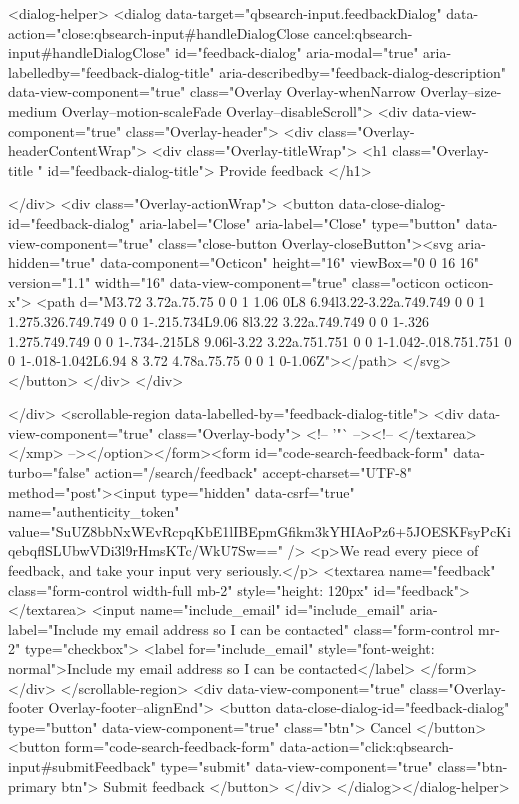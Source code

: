 <dialog-helper>
  <dialog data-target="qbsearch-input.feedbackDialog" data-action="close:qbsearch-input#handleDialogClose cancel:qbsearch-input#handleDialogClose" id="feedback-dialog" aria-modal="true" aria-labelledby="feedback-dialog-title" aria-describedby="feedback-dialog-description" data-view-component="true" class="Overlay Overlay-whenNarrow Overlay--size-medium Overlay--motion-scaleFade Overlay--disableScroll">
    <div data-view-component="true" class="Overlay-header">
  <div class="Overlay-headerContentWrap">
    <div class="Overlay-titleWrap">
      <h1 class="Overlay-title " id="feedback-dialog-title">
        Provide feedback
      </h1>
        
    </div>
    <div class="Overlay-actionWrap">
      <button data-close-dialog-id="feedback-dialog" aria-label="Close" aria-label="Close" type="button" data-view-component="true" class="close-button Overlay-closeButton"><svg aria-hidden="true" data-component="Octicon" height="16" viewBox="0 0 16 16" version="1.1" width="16" data-view-component="true" class="octicon octicon-x">
    <path d="M3.72 3.72a.75.75 0 0 1 1.06 0L8 6.94l3.22-3.22a.749.749 0 0 1 1.275.326.749.749 0 0 1-.215.734L9.06 8l3.22 3.22a.749.749 0 0 1-.326 1.275.749.749 0 0 1-.734-.215L8 9.06l-3.22 3.22a.751.751 0 0 1-1.042-.018.751.751 0 0 1-.018-1.042L6.94 8 3.72 4.78a.75.75 0 0 1 0-1.06Z"></path>
</svg></button>
    </div>
  </div>
  
</div>
      <scrollable-region data-labelled-by="feedback-dialog-title">
        <div data-view-component="true" class="Overlay-body">        <!-- '"` --><!-- </textarea></xmp> --></option></form><form id="code-search-feedback-form" data-turbo="false" action="/search/feedback" accept-charset="UTF-8" method="post"><input type="hidden" data-csrf="true" name="authenticity_token" value="SuUZ8bbNxWEvRcpqKbE1lIBEpmGfikm3kYHIAoPz6+5JOESKFsyPcKiqebqflSLUbwVDi3l9rHmsKTc/WkU7Sw==" />
          <p>We read every piece of feedback, and take your input very seriously.</p>
          <textarea name="feedback" class="form-control width-full mb-2" style="height: 120px" id="feedback"></textarea>
          <input name="include_email" id="include_email" aria-label="Include my email address so I can be contacted" class="form-control mr-2" type="checkbox">
          <label for="include_email" style="font-weight: normal">Include my email address so I can be contacted</label>
</form></div>
      </scrollable-region>
      <div data-view-component="true" class="Overlay-footer Overlay-footer--alignEnd">          <button data-close-dialog-id="feedback-dialog" type="button" data-view-component="true" class="btn">    Cancel
</button>
          <button form="code-search-feedback-form" data-action="click:qbsearch-input#submitFeedback" type="submit" data-view-component="true" class="btn-primary btn">    Submit feedback
</button>
</div>
</dialog></dialog-helper>

